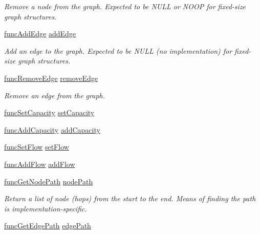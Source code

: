 \begin{DoxyCompactItemize}
\begin{DoxyCompactList}\small\item\em Remove a node from the graph. Expected to be N\+U\+LL or N\+O\+OP for fixed-\/size graph structures. \end{DoxyCompactList}\item 
\hyperlink{graphops_8h_aba7336fb04b988fb797cbcd8c9207d64}{func\+Add\+Edge} \hyperlink{structgraphops__t_af9a74b6643b49f7799dfa78f4824aa22}{add\+Edge}
\begin{DoxyCompactList}\small\item\em Add an edge to the graph. Expected to be N\+U\+LL (no implementation) for fixed-\/size graph structures. \end{DoxyCompactList}\item 
\hyperlink{graphops_8h_add68b0e594df34b6e201605a3757b78b}{func\+Remove\+Edge} \hyperlink{structgraphops__t_a330cbf9dbf71b84a47ab7ac8a11d71fa}{remove\+Edge}
\begin{DoxyCompactList}\small\item\em Remove an edge from the graph. \end{DoxyCompactList}\item 
\hyperlink{graphops_8h_aafd2cceeca9e12b071826c74ce049e7b}{func\+Set\+Capacity} \hyperlink{structgraphops__t_a6f05f8daf75bc380988e20e019681c0a}{set\+Capacity}
\item 
\hyperlink{graphops_8h_a55fd1e1994412d16611818d876b2488e}{func\+Add\+Capacity} \hyperlink{structgraphops__t_aafe9596d5e7ae4ba579213c1f0c789c7}{add\+Capacity}
\item 
\hyperlink{graphops_8h_a69ba36f21492df6ab16e426fffcf0c47}{func\+Set\+Flow} \hyperlink{structgraphops__t_ad62e88e4ea9ffdae0c3fb681433e3d92}{set\+Flow}
\item 
\hyperlink{graphops_8h_a595d28f6e4e3cef8d9549139dd40af53}{func\+Add\+Flow} \hyperlink{structgraphops__t_ae412853235d06cde6a63257a5fc172e1}{add\+Flow}
\item 
\hyperlink{graphops_8h_aa08f7024e2b4f15854812450627dbad6}{func\+Get\+Node\+Path} \hyperlink{structgraphops__t_afd2a0b194e922fa656b4352a8fed9e05}{node\+Path}
\begin{DoxyCompactList}\small\item\em Return a list of node (hops) from the start to the end. Means of finding the path is implementation-\/specific. \end{DoxyCompactList}\item 
\hyperlink{graphops_8h_a03b36c65e027cd66fadeb70703a50a2e}{func\+Get\+Edge\+Path} \hyperlink{structgraphops__t_ab0fdace070db2a1fa199e920b6136a04}{edge\+Path}

\end{DoxyCompactItemize}
